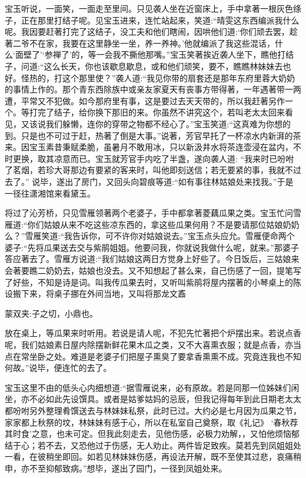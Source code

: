 \begin{parag}
    宝玉听说，一面笑，一面走至里间。只见袭人坐在近窗床上，手中拿著一根灰色绦子，正在那里打结子呢。见宝玉进来，连忙站起来，笑道:“晴雯这东西编派我什么呢。我因要赶著打完了这结子，没工夫和他们瞎闹，因哄他们道:‘你们顽去罢，趁著二爷不在家，我要在这里静坐一坐，养一养神。’他就编派了我这些混话，什么‘面壁了’‘参禅了’的，等一会我不撕他那嘴。”宝玉笑著挨近袭人坐下，瞧他打结子，问道:“这么长天，你也该歇息歇息，或和他们顽笑，要不，瞧瞧林妹妹去也好。怪热的，打这个那里使？”袭人道:“我见你带的扇套还是那年东府里蓉大奶奶的事情上作的。那个青东西除族中或亲友家夏天有丧事方带得著，一年遇著带一两遭，平常又不犯做。如今那府里有事，这是要过去天天带的，所以我赶著另作一个。等打完了结子，给你换下那旧的来。你虽然不讲究这个，若叫老太太回来看见，又该说我们躲懒，连你的穿带之物都不经心了。”宝玉笑道:“这真难为你想的到。只是也不可过于赶，热著了倒是大事。”说著，芳官早托了一杯凉水内新湃的茶来。因宝玉素昔秉赋柔脆，虽暑月不敢用冰，只以新汲井水将茶连壶浸在盆内，不时更换，取其凉意而已。宝玉就芳官手内吃了半盏，遂向袭人道: “我来时已吩咐了茗烟，若珍大哥那边有要紧的客来时，叫他即刻送信；若无要紧的事，我就不过去了。” 说毕，遂出了房门，又回头向碧痕等道:“如有事往林姑娘处来找我。”于是一径往潇湘馆来看黛玉。
\end{parag}


\begin{parag}
    将过了沁芳桥，只见雪雁领著两个老婆子，手中都拿著菱藕瓜果之类。宝玉忙问雪雁道:“你们姑娘从来不吃这些凉东西的，拿这些瓜果何用？不是要请那位姑娘奶奶么？”雪雁笑道:“我告诉你，可不许你对姑娘说去。”宝玉点头应允。雪雁便命两个婆子:“先将瓜果送去交与紫鹃姐姐。他要问我，你就说我做什么呢，就来。”那婆子答应著去了。雪雁方说道:“我们姑娘这两日方觉身上好些了。今日饭后，三姑娘来会著要瞧二奶奶去，姑娘也没去。又不知想起了甚么来，自己伤感了一回，提笔写了好些，不知是诗是词。叫我传瓜果去时，又听叫紫鹃将屋内摆著的小琴桌上的陈设搬下来，将桌子挪在外间当地，又叫将那龙文鼒\begin{note}蒙双夹:子之切，小鼎也。\end{note}放在桌上，等瓜果来时听用。若说是请人呢，不犯先忙著把个炉摆出来。若说点香呢，我们姑娘素日屋内除摆新鲜花果木瓜之类，又不大喜熏衣服；就是点香，亦当点在常坐卧之处。难道是老婆子们把屋子熏臭了要拿香熏熏不成。究竟连我也不知何故。”说毕，便连忙的去了。
\end{parag}


\begin{parag}
    宝玉这里不由的低头心内细想道:“据雪雁说来，必有原故。若是同那一位姊妹们闲坐，亦不必如此先设馔具。或者是姑爹姑妈的忌辰，但我记得每年到此日期老太太都吩咐另外整理肴馔送去与林妹妹私祭，此时已过。大约必是七月因为瓜果之节，家家都上秋祭的坟，林妹妹有感于心，所以在私室自己奠祭，取《礼记》 ‘春秋荐其时食’之意，也未可定。但我此刻走去，见他伤感，必极力劝解，，又怕他烦恼郁结于心；若不去，又恐他过于伤感，无人劝止。两件皆足致疾。莫若先到凤姐姐处一看，在彼稍坐即回。如若见林妹妹伤感，再设法开解，既不至使其过悲，哀痛稍申，亦不至抑郁致病。”想毕，遂出了园门，一径到凤姐处来。
\end{parag}


